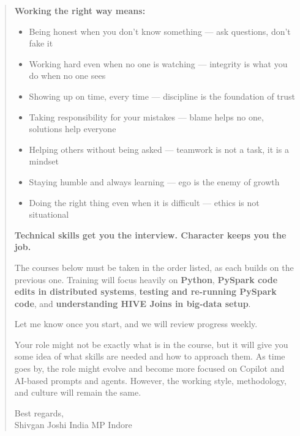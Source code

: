 \documentclass[12pt]{article}
\begin{document}
\begin{quote}
		\vspace{0.3cm}
		\noindent \textbf{Working the right way means:}
		\begin{itemize}
			\item Being honest when you don't know something — ask questions, don't fake it
			\item Working hard even when no one is watching — integrity is what you do when no one sees
			\item Showing up on time, every time — discipline is the foundation of trust
			\item Taking responsibility for your mistakes — blame helps no one, solutions help everyone
			\item Helping others without being asked — teamwork is not a task, it is a mindset
			\item Staying humble and always learning — ego is the enemy of growth
			\item Doing the right thing even when it is difficult — ethics is not situational
		\end{itemize}
		
		\vspace{0.3cm}
		\noindent \textbf{Technical skills get you the interview. Character keeps you the job.}
		
		\vspace{0.3cm}
		\noindent The courses below must be taken in the order listed, as each builds on the previous one. Training will focus heavily on \textbf{Python}, \textbf{PySpark code edits in distributed systems}, \textbf{testing and re-running PySpark code}, and \textbf{understanding HIVE Joins in big-data setup}.
		
		Let me know once you start, and we will review progress weekly.
		
		Your role might not be exactly what is in the course, but it will give you some idea of what skills are needed and how to approach them. As time goes by, the role might evolve and become more focused on Copilot and AI-based prompts and agents. However, the working style, methodology, and culture will remain the same.
		
		Best regards, \\
		Shivgan Joshi India MP Indore
	\end{quote}
	
	\newpage
	
\end{document}
